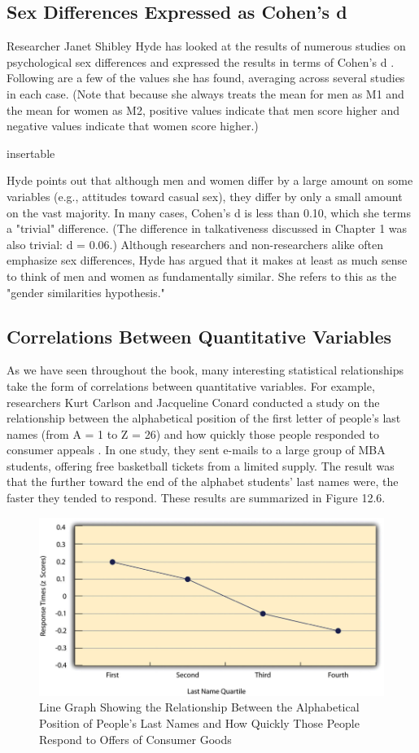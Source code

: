 \subsection{Sex Differences Expressed as Cohen's d}

Researcher Janet Shibley Hyde has looked at the results of numerous studies on psychological sex differences and expressed the results in terms of Cohen's d \citep{hyde_new_2007}. Following are a few of the values she has found, averaging across several studies in each case. (Note that because she always treats the mean for men as M1 and the mean for women as M2, positive values indicate that men score higher and negative values indicate that women score higher.)
 
insertable

Hyde points out that although men and women differ by a large amount on some variables (e.g., attitudes toward casual sex), they differ by only a small amount on the vast majority. In many cases, Cohen's d is less
than 0.10, which she terms a "trivial" difference. (The difference in talkativeness discussed in Chapter 1 was also trivial: d = 0.06.) Although researchers and non-researchers alike often emphasize sex differences, Hyde has argued that it makes at least as much sense to think of men and women as fundamentally similar. She refers to this as the "gender similarities hypothesis."

\subsection{Correlations Between Quantitative Variables}

As we have seen throughout the book, many interesting statistical relationships take the form of correlations between quantitative variables. For example, researchers Kurt Carlson and Jacqueline Conard conducted a study on the relationship between the alphabetical position of the first letter of people's last names (from A = 1 to Z = 26) and how quickly those people responded to consumer appeals \citep{carlson_last_2011}. In one study, they sent e-mails to a large group of MBA students, offering free basketball tickets from a limited supply. The result was that the further toward the end of the alphabet students' last names were, the faster they tended to respond. These results are summarized in Figure 12.6.


\begin{figure}
\includegraphics[width=.7\linewidth]{figures/Fig12-6}
\caption{Line Graph Showing the Relationship Between the Alphabetical Position of People's Last Names and How Quickly Those People Respond to Offers of Consumer Goods}
\label{fig:line}
\end{figure}

